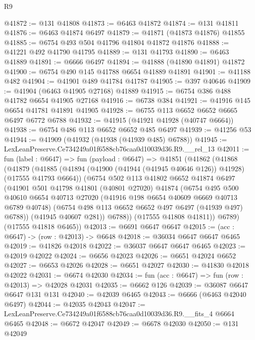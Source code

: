 \begin{lexlean}{R9}
\begin{coremodule}
@41872 := @131 @41808
@41873 := @6463 @41872
@41874 := @131 @41811
@41876 := @6463 @41874 @6497
@41879 := @41871 (@41873 @41876) @41855
@41885 := @6754 @493 @504 @41796 @41804 @41872 @41876
@41888 := @41221 @492 @41790 @41795
@41889 := @131 @41793
@41890 := @6463 @41889
@41891 := @6666 @6497
@41894 := @41888 (@41890 @41891) @41872
@41900 := @6754 @490 @145 @41788 @6654 @41889 @41891
@41901 := @41188 @482
@41904 := @41901 @489 @41784 @41787
@41905 := @397 @40646
@41909 := @41904 (@6463 @41905 @27168) @41889
@41915 := @6754 @386 @488 @41782 @6654 @41905 @27168
@41916 := @6738 @384
@41921 := @41916 @145 @6654 @41781 @41891 @41905
@41928 := @6755 @113 @6652 @6652 @6665 @6497 @6772 @6788
@41932 := @41915 (@41921 @41928 (@40747 @6664))
@41938 := @6754 @486 @113 @6652 @6652 @485 @6497
@41939 := @41256 @53
@41944 := @41909 (@41932 (@41938 (@41939 @485) @6788))
@41945 := LexLeanPreserve.Ce734249a01f6588cb76caa0d10039d36.R9.__rel_13
@42011 := fun (label : @6647) =>
  fun (payload : @6647) =>
  @41851
    (@41862
      (@41868
        (@41879
          (@41885
            (@41894 (@41900 (@41944 (@41945 @40646 @126)) @41928) (@17555 @41793 @6664))
            (@6754
              @502
              @113
              @41802
              @6652
              @41874
              @6497
              (@41901
                @501
                @41798
                @41801
                (@40801 @27020)
                @41874
                (@6754
                  @495
                  @500
                  @40610
                  @6654
                  @40713
                  @27020
                  (@41916 @198 @6654 @40609 @6669 @40713 @6789 @40748)
                  (@6754 @498 @113 @6652 @6652 @497 @6497 (@41939 @497) @6788))
                (@41945 @40607 @281))
              @6788))
          (@17555 @41808 @41811))
        @6789)
      (@17555 @41818 @6465))
@42013 := @6691 @6647 @6647
@42015 := (acc : @6647) -> (row : @42013) -> @6648
@42018 := @36034 @6647 @6647 @6465
@42019 := @41826 @42018
@42022 := @36037 @6647 @6647 @6465
@42023 := @42019 @42022
@42024 := @6656 @42023
@42026 := @6651 @42024 @6652
@42027 := @6653 @42026
@42028 := @6651 @42027
@42030 := @41830 @42018 @42022
@42031 := @6674 @42030
@42034 := fun (acc : @6647) => fun (row : @42013) => @42028 @42031
@42035 := @6662 @126
@42039 := @36087 @6647 @6647 @131 @131
@42040 := @42039 @6465
@42043 := @6666 (@6463 @42040 @6497)
@42044 := @42035 @42043
@42047 := LexLeanPreserve.Ce734249a01f6588cb76caa0d10039d36.R9.__fits_4 @6664 @6465
@42048 := @6672 @42047
@42049 := @6678 @42030
@42050 := @131 @42049

\end{coremodule}
\end{lexlean}
